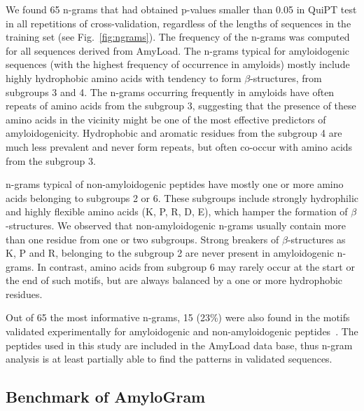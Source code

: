 \documentclass[fleqn,10pt,twoside]{gcb15submission}
\begin{document}
  We found 65 n-grams that had obtained p-values smaller than 0.05 in QuiPT test 
in all repetitions of cross-validation, regardless of the lengths of sequences 
in the training set (see Fig.~\ref{fig:ngrams}). The frequency of the n-grams 
was computed for all sequences derived from AmyLoad. The n-grams typical for 
amyloidogenic sequences (with the highest frequency of occurrence in amyloids) 
mostly include highly hydrophobic amino acids with tendency to form 
$\beta$-structures, from subgroups 3 and 4. The n-grams occurring frequently in 
amyloids have often repeats of amino acids from the subgroup 3, suggesting that 
the presence of these amino acids in the vicinity might be one of the most 
effective predictors of amyloidogenicity. Hydrophobic and aromatic residues from 
the subgroup 4 are much less prevalent and never form repeats, but often 
co-occur with amino acids from the subgroup 3. 

  n-grams typical of non-amyloidogenic peptides have mostly one or 
more amino acids belonging to subgroups 2 or 6. These subgroups include 
strongly hydrophilic and highly flexible amino acids (K, P, R, D, E), which 
hamper the formation of $\beta$-structures. We observed that non-amyloidogenic 
n-grams usually contain more than one residue from one or two subgroups. Strong 
breakers of $\beta$-structures as K, P and R, belonging to the subgroup 2 are 
never present in amyloidogenic n-grams. In contrast, amino acids from subgroup 
6 may rarely occur at the start or the end of such motifs, but are always 
balanced by a one or more hydrophobic residues.

  Out of 65 the most informative n-grams, 15 (23\%) were also found in the motifs 
validated experimentally for amyloidogenic and non-amyloidogenic 
peptides~\citep{lopez_de_la_paz_sequence_2004}. The peptides used in this study are 
included in the AmyLoad data base, thus n-gram analysis is at least 
partially able to find the patterns in validated sequences.

\subsection{Benchmark of AmyloGram}
\end{document}
